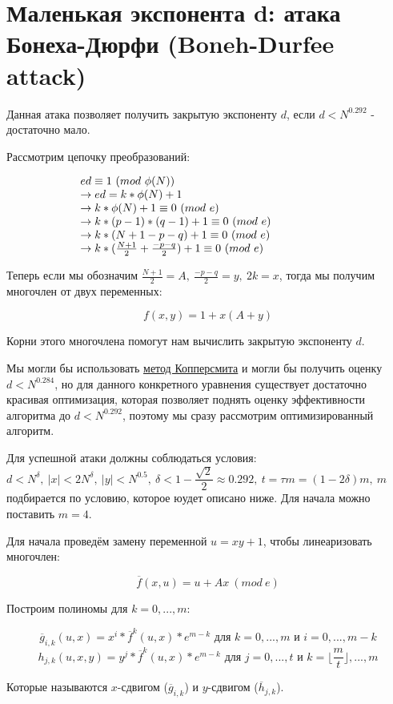 \documentclass[12pt,a4paper]{scrartcl}
\begin{document}
\section{Маленькая экспонента d: атака Бонеха-Дюрфи (Boneh-Durfee attack)}

Данная атака позволяет получить закрытую экспоненту $d$, если $d< N^{0.292}$ - достаточно мало.

Рассмотрим цепочку преобразований:

$$\parbox{8cm}{$ed \equiv 1\ (mod\ \phi(N)) \\
	\rightarrow ed=k*\phi(N)+1 \\
	\rightarrow k*\phi(N)+1 \equiv 0\ (mod\ e) \\
	\rightarrow k*(p-1)*(q-1)+1 \equiv 0\ (mod\ e) \\
	\rightarrow k*(N+1-p-q)+1 \equiv 0\ (mod\ e) \\
	\rightarrow k*(\frac{N+1}{2}+\frac{-p-q}{2})+1 \equiv 0\ (mod\ e)$}$$

Теперь если мы обозначим $\frac{N+1}{2}=A,\ \frac{-p-q}{2}=y,\ 2k=x$, тогда мы получим многочлен от двух переменных: 

$$f(x,y)=1+x(A+y)$$

Корни этого многочлена помогут нам вычислить закрытую экспоненту $d$.

Мы могли бы использовать \href{https://yatb.kksctf.ru/}{метод Копперсмита} и могли бы получить оценку $d < N^{0.284}$, но для данного конкретного уравнения существует достаточно красивая оптимизация, которая позволяет поднять оценку эффективности алгоритма до $d < N^{0.292}$, поэтому мы сразу рассмотрим оптимизированный алгоритм.

Для успешной атаки должны соблюдаться условия: $d < N^{\delta},\ |x|< 2N^{\delta},\  |y| < N^{0.5},\ \delta < 1-\dfrac{\sqrt{2}}{2} \approx 0.292,\ t=\tau m=(1-2\delta)m,\ m$ подбирается по условию, которое юудет описано ниже. Для начала можно поставить $m=4$.

Для начала проведём замену переменной $u=xy+1$, чтобы линеаризовать многочлен:

$$\overline{f}(x,u)=u+Ax\ (mod\ e)$$

Построим полиномы  для $k=0,...,m:$

$$\overline{g}_{i,k}(u,x)=x^i*\overline{f}^k(u,x)*e^{m-k}\text{ для }k=0,...,m\text{ и }i=0,...,m-k$$
$$h_{j,k}(u,x,y)=y^j*\overline{f}^k(u,x)*e^{m-k}\text{ для }j=0,...,t\text{ и }k=\lfloor\dfrac{m}{t}\rfloor,...,m$$

Которые называются $x$-сдвигом ($\overline{g}_{i,k}$) и $y$-сдвигом ($\overline{h}_{j,k}$).
\end{document}

